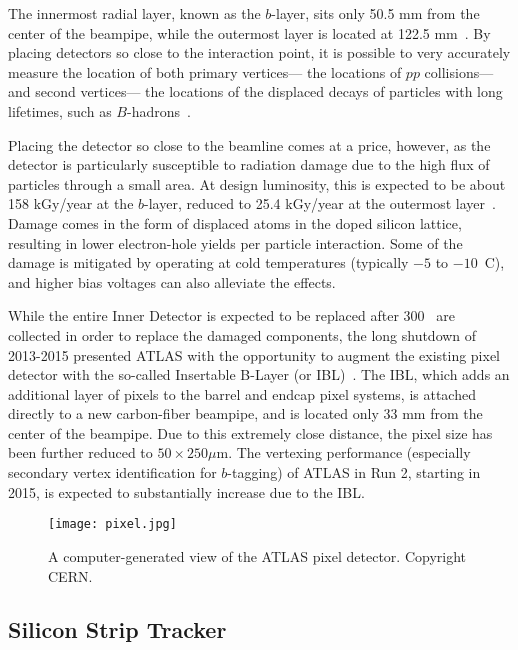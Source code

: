 The innermost radial layer, known as the $b$-layer, sits only 50.5 mm from the center of the beampipe, while the outermost layer is located at 122.5 mm~\cite{ATLASPaper}. By placing detectors so close to the interaction point, it is possible to very accurately measure the location of both  primary vertices--- the locations of $pp$ collisions--- and second vertices--- the locations of the displaced decays of particles with long lifetimes, such as $B$-hadrons~\cite{ATLASExpected}.

Placing the detector so close to the beamline comes at a price, however, as the detector is particularly susceptible to radiation damage due to the high flux of particles through a small area. At design luminosity, this is expected to be about 158 kGy/year at the $b$-layer, reduced to 25.4 kGy/year at the outermost layer~\cite{ATLASPaper}. Damage comes in the form of displaced atoms in the doped silicon lattice, resulting in lower electron-hole yields per particle interaction. Some of the damage is mitigated by operating at cold temperatures (typically $-5$ to $-10$\degree~C), and higher bias voltages can also alleviate the effects.

While the entire Inner Detector is expected to be replaced after 300 \ifb~are collected in order to replace the damaged components, the long shutdown of 2013-2015 presented ATLAS with the opportunity to augment the existing pixel detector with the so-called Insertable B-Layer (or IBL)~\cite{ATLASIBL}. The IBL, which adds an additional layer of pixels to the barrel and endcap pixel systems, is attached directly to a new carbon-fiber beampipe, and is located only 33 mm from the center of the beampipe. Due to this extremely close distance, the pixel size has been further reduced to $50 \times 250 \mu$m. The vertexing performance (especially secondary vertex identification for $b$-tagging) of ATLAS in Run 2, starting in 2015, is expected to substantially increase due to the IBL. 


\begin{figure}
\centering
\texttt{[image: pixel.jpg]}
\caption{A computer-generated view of the ATLAS pixel detector. Copyright CERN.}
\label{fig:detector:pixel}
\end{figure}




\subsection{Silicon Strip Tracker}

